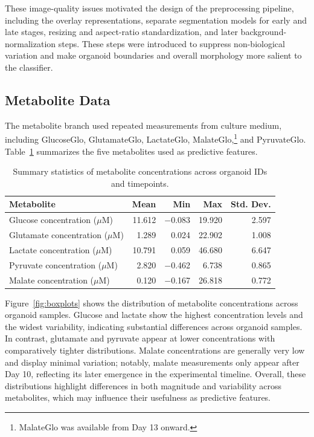 \documentclass{article}
\begin{document}
These image-quality issues motivated the design of the preprocessing pipeline, including the overlay representations, separate segmentation models for early and late stages, resizing and aspect-ratio standardization, and later background-normalization steps. These steps were introduced to suppress non-biological variation and make organoid boundaries and overall morphology more salient to the classifier.

\subsection{Metabolite Data}

The metabolite branch used repeated measurements from culture medium, including GlucoseGlo, GlutamateGlo, LactateGlo, MalateGlo,\footnote{MalateGlo was available from Day 13 onward.} and PyruvateGlo. Table~\ref{tab:metabolites} summarizes the five metabolites used as predictive features.

\begin{table}[H]
\centering
\renewcommand{\arraystretch}{1.4}
\begin{tabular}{|l|r|r|r|r|}
\hline
\textbf{Metabolite} & \textbf{Mean} & \textbf{Min} & \textbf{Max} & \textbf{Std. Dev.} \\
\hline
Glucose concentration ($\mu$M)   & 11.612 & $-$0.083 & 19.920 & 2.597 \\
\hline
Glutamate concentration ($\mu$M) &  1.289 &    0.024 & 22.902 & 1.008 \\
\hline
Lactate concentration ($\mu$M)   & 10.791 &    0.059 & 46.680 & 6.647 \\
\hline
Pyruvate concentration ($\mu$M)  &  2.820 & $-$0.462 &  6.738 & 0.865 \\
\hline
Malate concentration ($\mu$M)    &  0.120 & $-$0.167 & 26.818 & 0.772 \\
\hline
\end{tabular}
\caption{Summary statistics of metabolite concentrations across organoid IDs and timepoints.}
\label{tab:metabolites}
\end{table}

Figure~\ref{fig:boxplots} shows the distribution of metabolite concentrations across organoid samples. Glucose and lactate show the highest concentration levels and the widest variability, indicating substantial differences across organoid samples. In contrast, glutamate and pyruvate appear at lower concentrations with comparatively tighter distributions. Malate concentrations are generally very low and display minimal variation; notably, malate measurements only appear after Day 10, reflecting its later emergence in the experimental timeline. Overall, these distributions highlight differences in both magnitude and variability across metabolites, which may influence their usefulness as predictive features.
\end{document}

